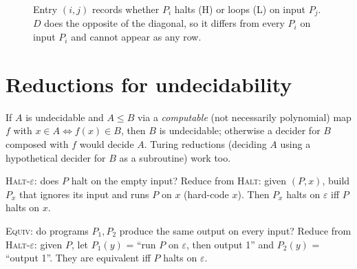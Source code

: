 \begin{figure}[H]
\centering
{}
\caption{Entry $(i,j)$ records whether $P_i$ halts (H) or loops (L) on input
$P_j$. $D$ does the opposite of the diagonal, so it differs from every
$P_i$ on input $P_i$ and cannot appear as any row.}
\end{figure}

\section{Reductions for undecidability}
If $A$ is undecidable and $A\le B$ via a \emph{computable} (not necessarily polynomial) map $f$ with $x\in A\iff f(x)\in B$, then $B$ is undecidable;
otherwise a decider for $B$ composed with $f$ would decide $A$. Turing reductions (deciding $A$ using a hypothetical decider for $B$ as a subroutine) work too.

\begin{example}
\textsc{Halt-}$\varepsilon$: does $P$ halt on the empty input? Reduce from \textsc{Halt}: given $(P,x)$, build $P_x$ that ignores its input and runs $P$ on $x$
(hard-code $x$). Then $P_x$ halts on $\varepsilon$ iff $P$ halts on $x$.
\end{example}

\begin{example}
\textsc{Equiv}: do programs $P_1,P_2$ produce the same output on every input? Reduce from \textsc{Halt-}$\varepsilon$: given $P$, let
$P_1(y)$ = ``run $P$ on $\varepsilon$, then output 1'' and $P_2(y)$ = ``output 1''. They are equivalent iff $P$ halts on $\varepsilon$.
\end{example}

